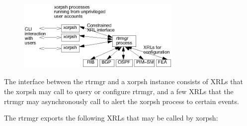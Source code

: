 \documentclass[11pt]{article}
\begin{document}
\begin{figure}[htb]
\centerline{\includegraphics[width=0.7\textwidth]{figs/xorpsh}}
\vspace{.05in}
\end{figure}

The interface between the rtrmgr and a xorpsh instance consists of
XRLs that the xorpsh may call to query or configure rtrmgr, and a few
XRLs that the rtrmgr may asynchronously call to alert the xorpsh
process to certain events.

The rtrmgr exports the following XRLs that may be called by xorpsh:
\end{document}
